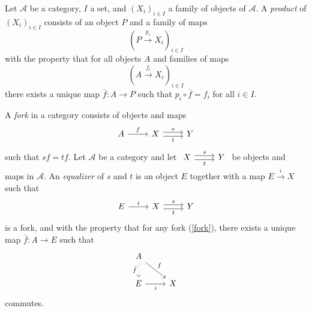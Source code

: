 \begin{definition}
  Let $\mathscr{A}$ be a category, $I$ a set, and $(X_i)_{i\in I}$ a family of objects of $\mathscr{A}$. A \textit{product} of $\left( X_i \right) _{i\in I}$ consists of an object $P$ and a family of maps
  \[
    \left( P\xrightarrow{p_i}X_i \right) _{i\in I}
  \] with the property that for all objects $A$ and families of maps
  \begin{equation}
    \left( A\xrightarrow{f_i} X_i\right) _{i\in I}
  \end{equation}there exists a unique map $\bar{f}:A\to P$ such that $p_i\circ \bar{f}=f_i$ for all $i \in I$.
\end{definition}

\begin{definition}
  A \textit{fork} in a category consists of objects and maps
  \begin{equation}
    \begin{tikzcd}
      A\arrow[r,"f"] &X\arrow[r,shift left,"s"] \arrow[r,shift right, "t"'] &Y\label{fork}
    \end{tikzcd}
  \end{equation}such that $sf=tf$.
  Let $\mathscr{A}$ be a category and let $
  \begin{tikzcd}
    X \arrow[r,shift left,"s"] \arrow[r,shift right,"t"']& Y
  \end{tikzcd}$ 
  be objects and maps in $\mathscr{A}$. An \textit{equalizer} of $s$ and $t$ is an object $E$ together with a map $E\xrightarrow{i}X$ such that 
  \[
  \begin{tikzcd}
    E\arrow[r,"i"] &X\arrow[r,shift left,"s"] \arrow[r,shift right,"t"'] &Y
  \end{tikzcd}
\] is a fork, and with the property that for any fork (\ref{fork}), there exists a unique map $\bar{f}:A\to E$ such that 
\begin{equation}
  \begin{tikzcd}
    A\arrow[d,dotted,"\bar{f}"' ] \arrow[rd,"f"]&\\
    E \arrow[r,"i"'] &X 
  \end{tikzcd}
\end{equation}
commutes.
\end{definition}

